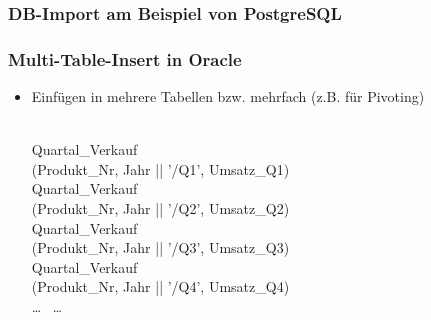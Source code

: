 
\begin{frame}

    \frametitle{DB-Import am Beispiel von PostgreSQL}
    
\end{frame}


\begin{frame}

    \frametitle{Multi-Table-Insert in Oracle}
    
    \begin{itemize}
    \item Einfügen in mehrere Tabellen bzw. mehrfach (z.B. für Pivoting)
    
    \hspace*{-1cm}\begin{sql}
     \\
     Quartal\_Verkauf \\
    \1  (Produkt\_Nr, Jahr || '/Q1', Umsatz\_Q1) \\
     Quartal\_Verkauf \\
    \1  (Produkt\_Nr, Jahr || '/Q2', Umsatz\_Q2) \\
     Quartal\_Verkauf \\
    \1  (Produkt\_Nr, Jahr || '/Q3', Umsatz\_Q3) \\
     Quartal\_Verkauf \\
    \1  (Produkt\_Nr, Jahr || '/Q4', Umsatz\_Q4) \\
     \dots\  \dots
    \end{sql}
    \end{itemize}
    
    \end{frame}
    
    
